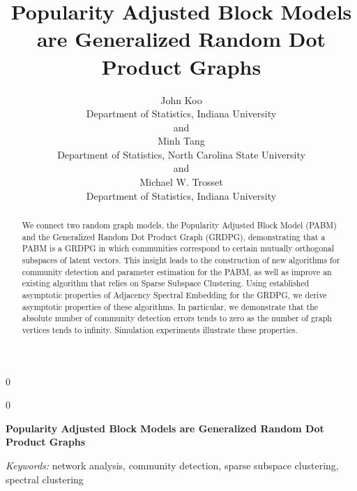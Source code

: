 \documentclass[12pt]{article}
\newcommand{\blind}{0}
\begin{document}
\def\spacingset#1{\renewcommand{\baselinestretch}%
{#1}\small\normalsize} \spacingset{1}



\blind
{
  \title{\bf Popularity Adjusted Block Models are Generalized Random Dot
Product Graphs}

  \author{
        John Koo \\
    Department of Statistics, Indiana University\\
     and \\     Minh Tang \\
    Department of Statistics, North Carolina State University\\
     and \\     Michael W. Trosset \\
    Department of Statistics, Indiana University\\
      }
  \maketitle
} \fi

\blind
{
  \bigskip
  \bigskip
  \bigskip
  \begin{center}
    {\LARGE\bf Popularity Adjusted Block Models are Generalized Random
Dot Product Graphs}
  \end{center}
  \medskip
} \fi

\bigskip
\begin{abstract}
We connect two random graph models, the Popularity Adjusted Block Model
(PABM) and the Generalized Random Dot Product Graph (GRDPG),
demonstrating that a PABM is a GRDPG in which communities correspond to
certain mutually orthogonal subspaces of latent vectors. This insight
leads to the construction of new algorithms for community detection and
parameter estimation for the PABM, as well as improve an existing
algorithm that relies on Sparse Subspace Clustering. Using established
asymptotic properties of Adjacency Spectral Embedding for the GRDPG, we
derive asymptotic properties of these algorithms. In particular, we
demonstrate that the absolute number of community detection errors tends
to zero as the number of graph vertices tends to infinity. Simulation
experiments illustrate these properties.
\end{abstract}

\noindent%
{\it Keywords:} network analysis, community detection, sparse subspace
clustering, spectral clustering
\vfill

\newpage
\spacingset{1.45} %





\end{document}
